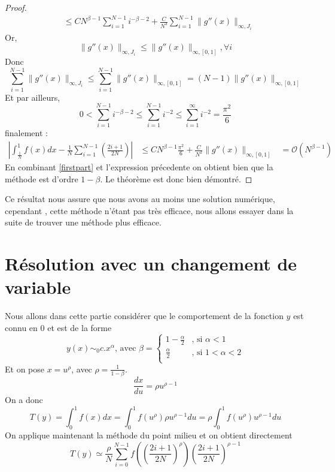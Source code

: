 \documentclass[a4paper,10pt]{article}
\begin{document}
\begin{proof}
\begin{equation}
\begin{align}
									     &\leq C N^{\beta - 1} \sum_{i=1}^{N-1}i^{-\beta - 2} + \frac{C}{N^3}\sum_{i=1}^{N-1} \|g''(x)  \|_{\infty, J_i}
 \end{align}
\end{equation}
Or,
\begin{equation}
 \|g''(x)  \|_{\infty, J_i} \leq \|g''(x)  \|_{\infty, [0,1]}, \forall i
\end{equation}
Donc
\begin{equation}
 \sum_{i=1}^{N-1}\|g''(x)  \|_{\infty, J_i} \leq \sum_{i=1}^{N-1}\|g''(x)  \|_{\infty, [0,1]} = (N-1)\|g''(x)  \|_{\infty, [0,1]} 
\end{equation}
Et par ailleurs,
\begin{equation}
 0 < \sum_{i=1}^{N-1}i^{-\beta - 2} \leq \sum_{i=1}^{N-1}i^{- 2} \leq \sum_{i=1}^{\infty}i^{- 2} = \frac{\pi ^2}{6}  
\end{equation}
finalement :
\begin{equation}
\begin{align}
 |\int_\frac{1}{N}^1f(x)dx - \frac{1}{N}\sum_{i=1}^{N-1}(\frac{2i + 1}{2N})| &\leq C N^{\beta - 1} \frac{\pi ^2}{6}  + \frac{C}{N^2}\|g''(x)  \|_{\infty, [0,1]} 
									     &= \mathcal{O}(N^{\beta - 1}) 
\end{align}
\end{equation}
 En combinant \ref{firstpart} et l'expression pr\'ecedente on obtient bien que la m\'ethode est d'ordre $1- \beta$. Le th\'eor\`eme est donc bien d\'emontr\'e.
\end{proof}
Ce r\'esultat nous assure que nous avons au moins une solution num\'erique, cependant , cette m\'ethode n'\'etant pas tr\`es efficace, nous allons essayer dans la suite de trouver une m\'ethode plus efficace.

\section{R\'esolution avec un changement de variable}
Nous allons dans cette partie consid\'erer que le comportement de la fonction $y$ est connu en 0 et est de la forme
\begin{equation}
 y(x)\sim_0 c.x^{\alpha} \text{, avec } \beta = \begin{cases}
						    1 - \frac{\alpha}{2} &\text{, si }\alpha < 1\\
						    \frac{\alpha}{2}	 &\text{, si } 1 < \alpha < 2\\
						 \end{cases}
\end{equation}
Et on pose $x = u^\rho$, avec $\rho = \frac{1}{1 - \beta}$.
\begin{equation}
 \frac{dx}{du} = \rho u^{\rho - 1}
\end{equation}
On a donc
\begin{equation}
 T(y) = \int_0^1f(x)dx = \int_0^1f(u^\rho)\rho u^{\rho - 1} du = \rho \int_0^1f(u^\rho) u^{\rho - 1} du
\end{equation}
On applique maintenant la m\'ethode du point milieu et on obtient directement 
\begin{equation}
 T(y) \simeq \frac{\rho}{N}\sum_{i=0}^{N-1}f((\frac{2i + 1}{2N})^{\rho})(\frac{2i + 1}{2N})^{\rho - 1}
\end{equation}
\end{document}
